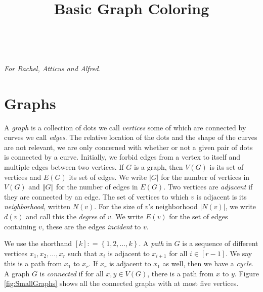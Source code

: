 \documentclass[openany]{tufte-book} %
\title{\Large{Basic Graph Coloring}}
\author{}
\theoremstyle{plain}
\newcommand{\set}[1]{\left\{ #1 \right\}}
\newcommand{\card}[1]{\left|#1\right|}
\newcommand{\size}[1]{\left\Vert#1\right\Vert}
\newcommand{\irange}[1]{\left[#1\right]}
\newcommand{\DefinedAs}{\mathrel{\mathop:}=}
\begin{document}
\frontmatter
\maketitle 


\tableofcontents


\cleardoublepage
~\vfill
\begin{doublespace}
\noindent\fontsize{18}{22}\selectfont\itshape
\nohyphenation
For Rachel, Atticus and Alfred.
\end{doublespace}
\vfill
\vfill

\cleardoublepage
\mainmatter
\chapter{Graphs}
A \emph{graph} is a collection of dots we call \emph{vertices} some of which are connected by curves we call \emph{edges}. 
The relative location of the dots and the shape of the curves are not relevant, we are only concerned with whether or not a given
pair of dots is connected by a curve.  Initially, we forbid edges from a vertex to itself and multiple edges between two vertices.
If $G$ is a graph, then $V(G)$ is its set of vertices and $E(G)$ its set of edges. 
We write $\card{G}$ for the number of vertices in $V(G)$ and $\size{G}$ for the number of edges in $E(G)$.
Two vertices
are \emph{adjacent}  if they are connected by an edge.  The set
of vertices to which $v$ is adjacent is its \emph{neighborhood}, written $N(v)$. 
For the size of $v$'s neighborhood $\card{N(v)}$, we write $d(v)$ and call this the \emph{degree} of $v$.
We write $E(v)$ for the set of edges containing $v$, these are the edges \emph{incident} to $v$.

We use the shorthand $\irange{k} \DefinedAs \set{1,2,\ldots, k}$. A \emph{path} in $G$ is a sequence of different vertices $x_1, x_2, \ldots, x_r$ such that $x_i$ is 
adjacent to $x_{i+1}$ for all $i \in \irange{r-1}$.  We say
this is a path from $x_1$ to $x_r$.
If $x_r$ is adjacent to $x_1$ as well, then we have a \emph{cycle}.  A graph $G$ is \emph{connected} if for all $x,y \in V(G)$, there is a path from $x$ to $y$.
Figure \ref{fig:SmallGraphs} shows all the connected graphs with at most five vertices.
\end{document}
